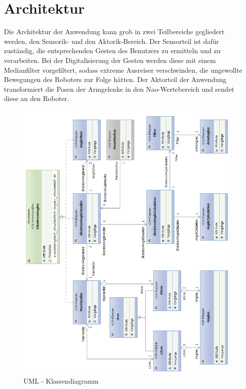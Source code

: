 %
%
\section{Architektur}\label{k:Architektur}
Die Architektur der Anwendung kann grob in zwei Teilbereiche gegliedert werden, den Sensorik- und den Aktorik-Bereich.
Der Sensorteil ist dafür zuständig, die entsprechenden Gesten des Benutzers zu ermitteln und zu verarbeiten. Bei der Digitalisierung der Gesten werden diese mit einem Medianfilter vorgefiltert, sodass extreme Ausreiser verschwinden, die ungewollte Bewegungen des Roboters zur Folge hätten.
Der Aktorteil der Anwendung transformiert die Posen der Armgelenke in den Nao-Wertebereich und sendet diese an den Roboter.

%
%
%


\begin{figure}[H]						
	\centering							
	\includegraphics[scale=0.8]{Bilder/classdiagramm.png}
	\caption{UML - Klassendiagramm}						
	\label{f:classdiagramm}						
\end{figure}

